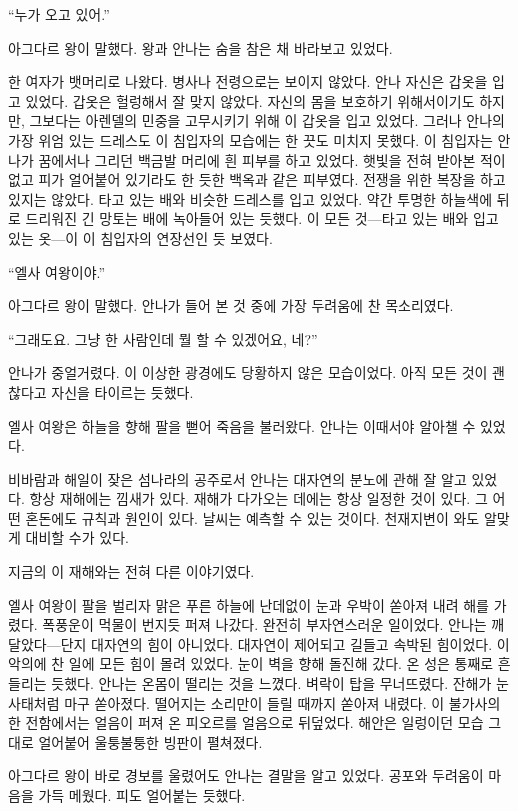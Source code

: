 ``누가 오고 있어.''

아그다르 왕이 말했다. 왕과 안나는 숨을 참은 채 바라보고 있었다.

한 여자가 뱃머리로 나왔다. 병사나 전령으로는 보이지 않았다. 안나 자신은 갑옷을 입고 있었다. 갑옷은 헐렁해서 잘 맞지 않았다. 자신의 몸을 보호하기 위해서이기도 하지만, 그보다는 아렌델의 민중을 고무시키기 위해 이 갑옷을 입고 있었다. 그러나 안나의 가장 위엄 있는 드레스도 이 침입자의 모습에는 한 끗도 미치지 못했다. 이 침입자는 안나가 꿈에서나 그리던 백금발 머리에 흰 피부를 하고 있었다. 햇빛을 전혀 받아본 적이 없고 피가 얼어붙어 있기라도 한 듯한 백옥과 같은 피부였다. 전쟁을 위한 복장을 하고 있지는 않았다. 타고 있는 배와 비슷한 드레스를 입고 있었다. 약간 투명한 하늘색에 뒤로 드리워진 긴 망토는 배에 녹아들어 있는 듯했다. 이 모든 것—타고 있는 배와 입고 있는 옷—이 이 침입자의 연장선인 듯 보였다.

``엘사 여왕이야.''

아그다르 왕이 말했다. 안나가 들어 본 것 중에 가장 두려움에 찬 목소리였다.

``그래도요. 그냥 한 사람인데 뭘 할 수 있겠어요, 네?''

안나가 중얼거렸다. 이 이상한 광경에도 당황하지 않은 모습이었다. 아직 모든 것이 괜찮다고 자신을 타이르는 듯했다.

엘사 여왕은 하늘을 향해 팔을 뻗어 죽음을 불러왔다. 안나는 이때서야 알아챌 수 있었다.

비바람과 해일이 잦은 섬나라의 공주로서 안나는 대자연의 분노에 관해 잘 알고 있었다. 항상 재해에는 낌새가 있다. 재해가 다가오는 데에는 항상 일정한 것이 있다. 그 어떤 혼돈에도 규칙과 원인이 있다. 날씨는 예측할 수 있는 것이다. 천재지변이 와도 알맞게 대비할 수가 있다.

지금의 이 재해와는 전혀 다른 이야기였다.

엘사 여왕이 팔을 벌리자 맑은 푸른 하늘에 난데없이 눈과 우박이 쏟아져 내려 해를 가렸다. 폭풍운이 먹물이 번지듯 퍼져 나갔다. 완전히 부자연스러운 일이었다. 안나는 깨달았다—단지 대자연의 힘이 아니었다. 대자연이 제어되고 길들고 속박된 힘이었다. 이 악의에 찬 일에 모든 힘이 몰려 있었다. 눈이 벽을 향해 돌진해 갔다. 온 성은 통째로 흔들리는 듯했다. 안나는 온몸이 떨리는 것을 느꼈다. 벼락이 탑을 무너뜨렸다. 잔해가 눈사태처럼 마구 쏟아졌다. 떨어지는 소리만이 들릴 때까지 쏟아져 내렸다. 이 불가사의한 전함에서는 얼음이 퍼져 온 피오르를 얼음으로 뒤덮었다. 해안은 일렁이던 모습 그대로 얼어붙어 울퉁불퉁한 빙판이 펼쳐졌다.

아그다르 왕이 바로 경보를 울렸어도 안나는 결말을 알고 있었다. 공포와 두려움이 마음을 가득 메웠다. 피도 얼어붙는 듯했다.

